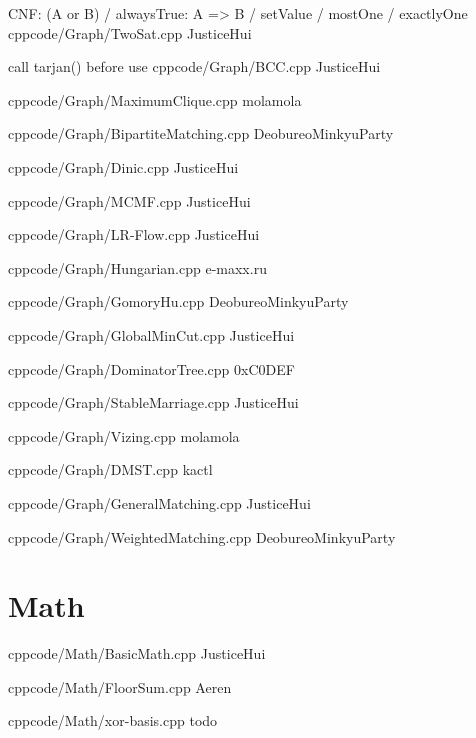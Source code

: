 \documentclass[landscape, 8pt, a4paper, oneside, twocolumn]{extarticle}
\begin{document}
{CNF: (A or B) / alwaysTrue: A => B / setValue / mostOne / exactlyOne}{}
{cpp}{code/Graph/TwoSat.cpp}
{JusticeHui}

{call tarjan() before use}{}
{cpp}{code/Graph/BCC.cpp}
{JusticeHui}

{}{}
{cpp}{code/Graph/MaximumClique.cpp}
{molamola}

{}{}
{cpp}{code/Graph/BipartiteMatching.cpp}
{DeobureoMinkyuParty}

{}{}
{cpp}{code/Graph/Dinic.cpp}
{JusticeHui}

{}{}
{cpp}{code/Graph/MCMF.cpp}
{JusticeHui}

{}{}
{cpp}{code/Graph/LR-Flow.cpp}
{JusticeHui}

{}{}
{cpp}{code/Graph/Hungarian.cpp}
{e-maxx.ru}

{}{}
{cpp}{code/Graph/GomoryHu.cpp}
{DeobureoMinkyuParty}

{}{}
{cpp}{code/Graph/GlobalMinCut.cpp}
{JusticeHui}

{}{}
{cpp}{code/Graph/DominatorTree.cpp}
{0xC0DEF}

{}{}
{cpp}{code/Graph/StableMarriage.cpp}
{JusticeHui}

{}{}
{cpp}{code/Graph/Vizing.cpp}
{molamola}

{}{}
{cpp}{code/Graph/DMST.cpp}
{kactl}

{}{}
{cpp}{code/Graph/GeneralMatching.cpp}
{JusticeHui}

{}{}
{cpp}{code/Graph/WeightedMatching.cpp}
{DeobureoMinkyuParty}

\section{Math}

{}{}
{cpp}{code/Math/BasicMath.cpp}
{JusticeHui}

{}{}
{cpp}{code/Math/FloorSum.cpp}
{Aeren}

{}{}
{cpp}{code/Math/xor-basis.cpp}
{todo}
\end{document}
